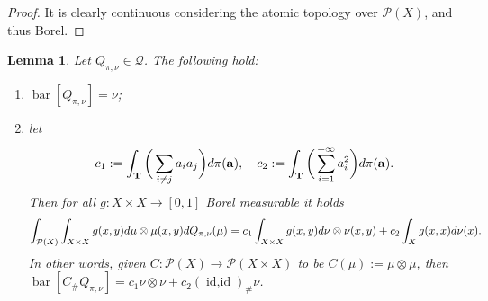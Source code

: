 \documentclass[10pt,leqno]{amsart}
\numberwithin{equation}{section}
\newtheorem{lemma}[teorema]{Lemma}
\newcommand{\Q}{\mathbb{Q}}
\newcommand{\PP}{\mathcal{P}}
\renewcommand{\Q}{Q}
\begin{document}
\begin{proof}
    It is clearly continuous considering the atomic topology over $\PP(X)$, and thus Borel.
\end{proof}

\begin{lemma}\label{lemma: barycenter of mu times mu}
    Let $\Q_{\pi,\nu}\in \mathcal{Q}$. The following hold:
    \begin{enumerate}
        \item $\operatorname{bar}[\Q_{\pi,\nu}] =  \nu$;
        \item let 
        \[c_1 := \int_{\bold{T}} \bigg(\sum_{i\neq j} a_ia_j\bigg) d\pi(\bold{a}), \quad c_2:= \int_{\bold{T}} \bigg(\sum_{i=1}^{+\infty} a_i^2 \bigg) d\pi(\bold{a}).\]
        Then for all $g:X\times X \to [0,1]$ Borel measurable it holds
        \begin{equation}
            \int_{\PP(X)}\int_{X \times X} g(x,y) d\mu\otimes \mu(x,y) d\\Q_{\pi,\nu}(\mu) = c_1\int_{ X \times  X }g(x,y)d\nu\otimes\nu(x,y) + c_2\int_{ X } g(x,x) d\nu(x).
        \end{equation}
        In other words, given $C:\PP( X )\to\PP( X \times  X )$ to be $C(\mu):= \mu\otimes \mu$, then $\operatorname{bar}[C_\#\Q_{\pi,\nu}] = c_1\nu\otimes \nu + c_2 (\operatorname{id,\operatorname{id}})_\#\nu$.
    \end{enumerate}
\end{lemma}
\end{document}
